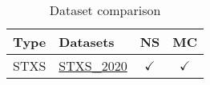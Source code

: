\documentclass{article}
\begin{document}
\begin{table}[H]
\footnotesize
\centering
\begin{tabular}{|c|l|c|c|}
\hline
 Type & Datasets  & NS & MC \\ \hline
\multirow{1}{*}{STXS}
 & \href{https://arxiv.org/abs/1302.3415}{STXS_2020}  & $\checkmark$ & $\checkmark$
\\ \hline
\end{tabular}
\caption{Dataset comparison}
\end{table}
\end{document}
